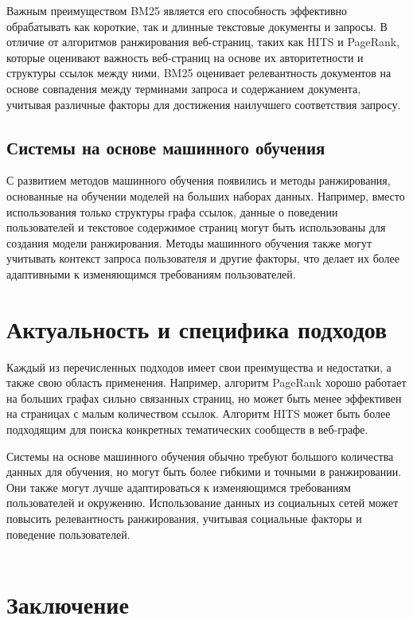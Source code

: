 \documentclass[a4paper]{article}
\begin{document}
Важным преимуществом BM25 является его способность эффективно обрабатывать как короткие, так и длинные текстовые документы и запросы. В отличие от алгоритмов ранжирования веб-страниц, таких как HITS и PageRank, которые оценивают важность веб-страниц на основе их авторитетности и структуры ссылок между ними, BM25 оценивает релевантность документов на основе совпадения между терминами запроса и содержанием документа, учитывая различные факторы для достижения наилучшего соответствия запросу.
	
	\subsection{Системы на основе машинного обучения}
	
	С развитием методов машинного обучения появились и методы ранжирования, основанные на обучении моделей на больших наборах данных. Например, вместо использования только структуры графа ссылок, данные о поведении пользователей и текстовое содержимое страниц могут быть использованы для создания модели ранжирования. Методы машинного обучения также могут учитывать контекст запроса пользователя и другие факторы, что делает их более адаптивными к изменяющимся требованиям пользователей.
	\newpage
	\section{Актуальность и специфика подходов}
	
	Каждый из перечисленных подходов имеет свои преимущества и недостатки, а также свою область применения. Например, алгоритм PageRank хорошо работает на больших графах сильно связанных страниц, но может быть менее эффективен на страницах с малым количеством ссылок. Алгоритм HITS может быть более подходящим для поиска конкретных тематических сообществ в веб-графе.
	
	Системы на основе машинного обучения обычно требуют большого количества данных для обучения, но могут быть более гибкими и точными в ранжировании. Они также могут лучше адаптироваться к изменяющимся требованиям пользователей и окружению. Использование данных из социальных сетей может повысить релевантность ранжирования, учитывая социальные факторы и поведение пользователей.
	\\
	\\
	\section{Заключение}
	
\end{document}
